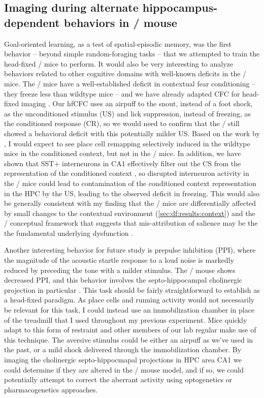 \subsection{Imaging during alternate hippocampus-dependent behaviors in \df/ mouse}
Goal-oriented learning, as a test of spatial-episodic memory, was the first behavior -- beyond simple random-foraging tasks -- that we attempted to train the head-fixed \df/ mice to perform.
It would also be very interesting to analyze behaviors related to other cognitive domains with well-known deficits in the \df/ mice.
The \df/ mice have a well-established deficit in contextual fear conditioning \citep[CFC,][]{Stark2008} -- they freeze less than wildtype mice -- and we have already adapted CFC for head-fixed imaging \citep[hfCFC,][]{Lovett-Barron2014}.
Our hfCFC uses an airpuff to the snout, instead of a foot shock, as the unconditioned stimulus (US) and lick suppression, instead of freezing, as the conditioned response (CR), so we would need to confirm that the \df/ still showed a behavioral deficit with this potentially milder US.
Based on the work by \citeauthor{Moita2004}, I would expect to see place cell remapping selectively induced in the wildtype mice in the conditioned context, but not in the \df/ mice.
In addition, we have shown that SST+ interneurons in CA1 effectively filter out the CS from the representation of the conditioned context \citep{Lovett-Barron2014}, so disrupted interneuron activity in the \df/ mice could lead to contamination of the conditioned context representation in the \ac{HPC} by the US, leading to the observed deficit in freezing.
This would also be generally consistent with my finding that the \df/ mice are differentially affected by small changes to the contextual environment (\autoref{sec:df:results:context}) and the \scz/ conceptual framework that suggests that mis-attribution of salience may be the the fundamental underlying dysfunction \citep{Kapur2003a}\citep{VanOs2009}.

Another interesting behavior for future study is prepulse inhibition (PPI), where the magnitude of the acoustic startle response to a loud noise is markedly reduced by preceding the tone with a milder stimulus.
The \df/ mouse shows decreased PPI, and this behavior involves the septo-hippocampal cholinergic projection in particular \citep{Koch1996}\citep{Swerdlow2001}.
This task should be fairly straightforward to establish as a head-fixed paradigm.
As place cells and running activity would not necessarily be relevant for this task, I could instead use an immobilization chamber in place of the treadmill that I used throughout my previous experiment.
Mice quickly adapt to this form of restraint and other members of our lab regular make use of this technique.
The aversive stimulus could be either an airpuff as we've used in the past, or a mild shock delivered through the immobilization chamber.
By imaging the cholinergic septo-hippocmapal projections in HPC area CA1 we could determine if they are altered in the \df/ mouse model, and if so, we could potentially attempt to correct the aberrant activity using optogenetics or pharmacogenetics approaches.

